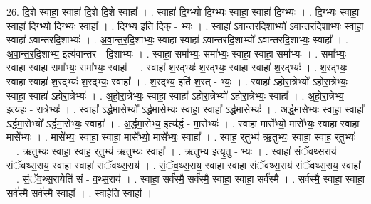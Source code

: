 \documentclass[17pt]{extarticle}
\begin{document}
26. दि॒शे स्वाहा॒ स्वाहा॑ दि॒शे दि॒शे स्वाहा᳚ । . स्वाहा॑ दि॒ग्भ्यो दि॒ग्भ्यः स्वाहा॒ स्वाहा॑ दि॒ग्भ्यः । . दि॒ग्भ्यः स्वाहा॒ स्वाहा॑ दि॒ग्भ्यो दि॒ग्भ्यः स्वाहा᳚ । . दि॒ग्भ्य इति॑ दिक् - भ्यः । . स्वाहा॑ ऽवान्तरदि॒शाभ्यो॑ ऽवान्तरदि॒शाभ्यः॒ स्वाहा॒ स्वाहा॑ ऽवान्तरदि॒शाभ्यः॑ । . अ॒वा॒न्त॒र॒दि॒शाभ्यः॒ स्वाहा॒ स्वाहा॑ ऽवान्तरदि॒शाभ्यो॑ ऽवान्तरदि॒शाभ्यः॒ स्वाहा᳚ । . अ॒वा॒न्त॒र॒दि॒शाभ्य॒ इत्य॑वान्तर - दि॒शाभ्यः॑ । . स्वाहा॒ समा᳚भ्यः॒ समा᳚भ्यः॒ स्वाहा॒ स्वाहा॒ समा᳚भ्यः । . समा᳚भ्यः॒ स्वाहा॒ स्वाहा॒ समा᳚भ्यः॒ समा᳚भ्यः॒ स्वाहा᳚ । . स्वाहा॑ श॒रद्भ्यः॑ श॒रद्भ्यः॒ स्वाहा॒ स्वाहा॑ श॒रद्भ्यः॑ । . श॒रद्भ्यः॒ स्वाहा॒ स्वाहा॑ श॒रद्भ्यः॑ श॒रद्भ्यः॒ स्वाहा᳚ । . श॒रद्भ्य॒ इति॑ श॒रत् - भ्यः॒ । . स्वाहा॑ ऽहोरा॒त्रेभ्यो॑ ऽहोरा॒त्रेभ्यः॒ स्वाहा॒ स्वाहा॑ ऽहोरा॒त्रेभ्यः॑ । . अ॒हो॒रा॒त्रेभ्यः॒ स्वाहा॒ स्वाहा॑ ऽहोरा॒त्रेभ्यो॑ ऽहोरा॒त्रेभ्यः॒ स्वाहा᳚ । . अ॒हो॒रा॒त्रेभ्य॒ इत्य॑हः - रा॒त्रेभ्यः॑ । . स्वाहा᳚ ऽर्द्धमा॒सेभ्यो᳚ ऽर्द्धमा॒सेभ्यः॒ स्वाहा॒ स्वाहा᳚ ऽर्द्धमा॒सेभ्यः॑ । . अ॒र्द्ध॒मा॒सेभ्यः॒ स्वाहा॒ स्वाहा᳚ ऽर्द्धमा॒सेभ्यो᳚ ऽर्द्धमा॒सेभ्यः॒ स्वाहा᳚ । . अ॒र्द्ध॒मा॒सेभ्य॒ इत्य॑र्द्ध - मा॒सेभ्यः॑ । . स्वाहा॒ मासे᳚भ्यो॒ मासे᳚भ्यः॒ स्वाहा॒ स्वाहा॒ मासे᳚भ्यः । . मासे᳚भ्यः॒ स्वाहा॒ स्वाहा॒ मासे᳚भ्यो॒ मासे᳚भ्यः॒ स्वाहा᳚ । . स्वाह॒ र्‌तुभ्य॑ ऋ॒तुभ्यः॒ स्वाहा॒ स्वाह॒ र्‌तुभ्यः॑ । . ऋ॒तुभ्यः॒ स्वाहा॒ स्वाह॒ र्‌तुभ्य॑ ऋ॒तुभ्यः॒ स्वाहा᳚ । . ऋ॒तुभ्य॒ इत्यृ॒तु - भ्यः॒ । . स्वाहा॑ संॅवथ्स॒राय॑ संॅवथ्स॒राय॒ स्वाहा॒ स्वाहा॑ संॅवथ्स॒राय॑ । . सं॒ॅव॒थ्स॒राय॒ स्वाहा॒ स्वाहा॑ संॅवथ्स॒राय॑ संॅवथ्स॒राय॒ स्वाहा᳚ । . सं॒ॅव॒थ्स॒रायेति॑ सं - व॒थ्स॒राय॑ । . स्वाहा॒ सर्व॑स्मै॒ सर्व॑स्मै॒ स्वाहा॒ स्वाहा॒ सर्व॑स्मै । . सर्व॑स्मै॒ स्वाहा॒ स्वाहा॒ सर्व॑स्मै॒ सर्व॑स्मै॒ स्वाहा᳚ । . स्वाहेति॒ स्वाहा᳚ । \newline
\end{document}
